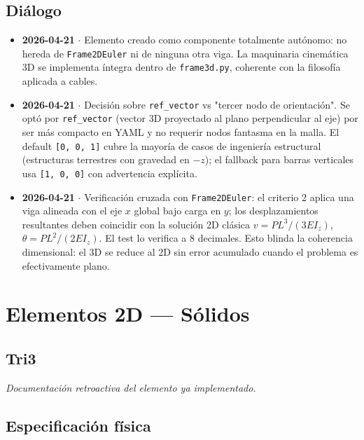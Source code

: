 \documentclass[11pt,letterpaper,oneside]{report}
\begin{document}
\section{Diálogo}

\begin{itemize}
  \item \textbf{2026-04-21} \ensuremath{\cdot} Elemento creado como componente totalmente autónomo: no hereda de \texttt{Frame2DEuler} ni de ninguna otra viga. La maquinaria cinemática 3D se implementa íntegra dentro de \texttt{frame3d.py}, coherente con la filosofía aplicada a cables.
  \item \textbf{2026-04-21} \ensuremath{\cdot} Decisión sobre \texttt{ref\_vector} vs "tercer nodo de orientación". Se optó por \texttt{ref\_vector} (vector 3D proyectado al plano perpendicular al eje) por ser más compacto en YAML y no requerir nodos fantasma en la malla. El default \texttt{[0, 0, 1]} cubre la mayoría de casos de ingeniería estructural (estructuras terrestres con gravedad en $-z$); el fallback para barras verticales usa \texttt{[1, 0, 0]} con advertencia explícita.
  \item \textbf{2026-04-21} \ensuremath{\cdot} Verificación cruzada con \texttt{Frame2DEuler}: el criterio 2 aplica una viga alineada con el eje $x$ global bajo carga en $y$; los desplazamientos resultantes deben coincidir con la solución 2D clásica $v = PL^3/(3EI_z)$, $\theta = PL^2/(2EI_z)$. El test lo verifica a 8 decimales. Esto blinda la coherencia dimensional: el 3D se reduce al 2D sin error acumulado cuando el problema es efectivamente plano.
\end{itemize}


\newpage

\chapter{Elementos 2D — Sólidos}

\section{Tri3}



\textit{Documentación retroactiva del elemento ya implementado.}



\section{Especificación física}
\end{document}
